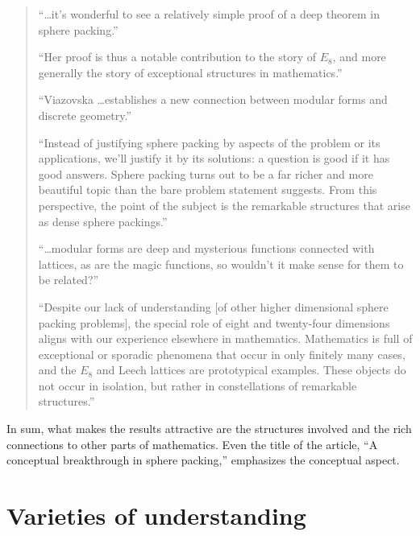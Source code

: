 \documentclass[12pt]{amsart}
\theoremstyle{definition}
\theoremstyle{remark}
\numberwithin{equation}{section}
\begin{document}
\begin{quote}

\smallskip

``\ldots it's wonderful to see a relatively simple proof of a deep theorem in sphere packing.''

\smallskip

``Her proof is thus a notable contribution to the story of $E_8$, and more generally the story of exceptional structures in mathematics.''

\smallskip

``Viazovska \ldots establishes a new connection between modular forms and discrete geometry.''

\smallskip

``Instead of justifying sphere packing by aspects of the problem or its applications, we'll justify it by its solutions: a question is good if it has good answers. Sphere packing turns out to be a far richer and more beautiful topic than the bare problem statement suggests. From this perspective, the point of the subject is the remarkable structures that arise as dense sphere packings.''

\smallskip

``\ldots modular forms are deep and mysterious functions connected with lattices, as are the magic functions, so wouldn't it make sense for them to be related?''

\smallskip

``Despite our lack of understanding [of other higher dimensional sphere packing problems], the special role of eight and twenty-four dimensions aligns with our experience elsewhere in mathematics. Mathematics is full of exceptional or sporadic phenomena that occur in only finitely many cases, and the $E_8$ and Leech lattices are prototypical examples. These objects do not occur in isolation, but rather in constellations of remarkable structures.''

\smallskip

\end{quote}
In sum, what makes the results attractive are the structures involved and the rich connections to other parts of mathematics. Even the title of the article, ``A conceptual breakthrough in sphere packing,'' emphasizes the conceptual aspect.

\section{Varieties of understanding}
\label{section:discussion}
\end{document}
